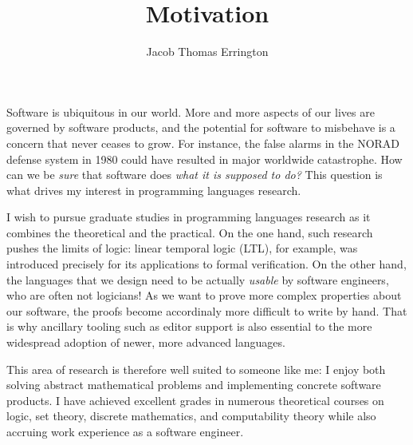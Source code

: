 \documentclass[11pt,letterpaper]{article}
\author{Jacob Thomas Errington}
\title{\vspace{-2em}Motivation}
\date{}
\begin{document}
\maketitle

Software is ubiquitous in our world. More and more aspects of our lives are
governed by software products, and the potential for software to misbehave is a
concern that never ceases to grow.
For instance, the false alarms in the NORAD defense system in 1980 could have
resulted in major worldwide catastrophe.
How can we be \emph{sure} that software does \emph{what it is supposed to do?}
This question is what drives my interest in programming languages research.

I wish to pursue graduate studies in programming languages research as it
combines the theoretical and the practical.
On the one hand, such research pushes the limits of logic: linear temporal
logic (LTL), for example, was introduced precisely for its applications to
formal verification.
On the other hand, the languages that we design need to be actually
\emph{usable} by software engineers, who are often not logicians!
As we want to prove more complex properties about our software, the proofs
become accordinaly more difficult to write by hand.
That is why ancillary tooling such as editor support is also essential to the
more widespread adoption of newer, more advanced languages.

This area of research is therefore well suited to someone like me: I enjoy
both solving abstract mathematical problems and implementing concrete software
products.
I have achieved excellent grades in numerous theoretical courses on logic, set
theory, discrete mathematics, and computability theory while also accruing work
experience as a software engineer.
\end{document}
